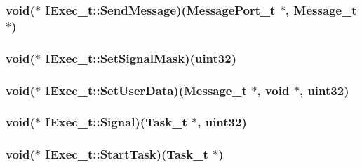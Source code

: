 \hypertarget{structIExec__t_a6f64a8bc0fbc09f77650bd8281040d1d}{
\subsubsection[{Send\+Message}]{\setlength{\rightskip}{0pt plus 5cm}void($\ast$ I\+Exec\+\_\+t\+::\+Send\+Message)({\bf Message\+Port\+\_\+t} $\ast$, {\bf Message\+\_\+t} $\ast$)}}\label{structIExec__t_a6f64a8bc0fbc09f77650bd8281040d1d}
\hypertarget{structIExec__t_aa87b8d32f626af3ceb38b1f5049592a1}{
\subsubsection[{Set\+Signal\+Mask}]{\setlength{\rightskip}{0pt plus 5cm}void($\ast$ I\+Exec\+\_\+t\+::\+Set\+Signal\+Mask)({\bf uint32})}}\label{structIExec__t_aa87b8d32f626af3ceb38b1f5049592a1}
\hypertarget{structIExec__t_a1de6bff504df7bec720d443453a4daab}{
\subsubsection[{Set\+User\+Data}]{\setlength{\rightskip}{0pt plus 5cm}void($\ast$ I\+Exec\+\_\+t\+::\+Set\+User\+Data)({\bf Message\+\_\+t} $\ast$, void $\ast$, {\bf uint32})}}\label{structIExec__t_a1de6bff504df7bec720d443453a4daab}
\hypertarget{structIExec__t_aa70ec2222796fd3d5315fe390b7d682f}{
\subsubsection[{Signal}]{\setlength{\rightskip}{0pt plus 5cm}void($\ast$ I\+Exec\+\_\+t\+::\+Signal)({\bf Task\+\_\+t} $\ast$, {\bf uint32})}}\label{structIExec__t_aa70ec2222796fd3d5315fe390b7d682f}
\hypertarget{structIExec__t_a9dbaa5cb36504fd913d3906781cd524d}{
\subsubsection[{Start\+Task}]{\setlength{\rightskip}{0pt plus 5cm}void($\ast$ I\+Exec\+\_\+t\+::\+Start\+Task)({\bf Task\+\_\+t} $\ast$)}}\label{structIExec__t_a9dbaa5cb36504fd913d3906781cd524d}
